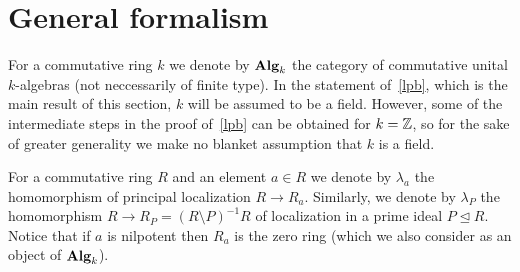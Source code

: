 \documentclass[oneside, 11pt]{amsart} \pdfoutput=1
\begin{document}
\section{General formalism}
\begin{comment}
The aim of this section is to formulate and prove Lindel--Popescu Theorem, a certain formal statement, which gives a sufficient condition for a general group-valued functor to be homotopy invariant. Later, in~\cref{sec:main} this result is applied to the functor $K_2$. Some of the machinery developed in this section also will be useful in the study of the $K_2$-analogue of Gersten's conjecture, see~\cref{sec:K2-GC}.

Let us briefly recall the historical context, which might help to explain our choice of the name for~\cref{lpb}. Recall that H.~Lindel's paper~\cite{Li81} has settled the geometric case of the Bass--Quillen conjecture for all regular $k$-algebras $R$ essentially of finite type over $k$. Later T.~Vorst has used Lindel's result in the proof of the homotopy invariance for the unstable $\K_1$-functor, see~\cite{Vo81}. Recall that Vorst's result asserts that $\K_{1,r}(R[t]) \cong \K_{1,r}(R)$ for $r\geq 3$ and a regular ring $R$ essentially finite type over a field. Next, D.~Popescu proved Bass--Quillen conjecture in equicharacteristic case~\cite{Po90}.  Finally, in her recent work~\cite{Sta14} A.~Stavrova has combined Vorst's theorem with a theorem of Popescu and obtained a more general homotopy invariance $\K_1^G(A[t]) \cong \K_1^G(A)$ for an arbitrary regular algebra $A$ over a perfect field $F$ and a sufficiently isotropic reductive group $G$ defined over $F$, see~\cite[Theorem~1.3]{Sta14}.

\subsection{A general Lindel--Popescu-type theorem}
\end{comment}
For a commutative ring $k$ we denote by ${\normalfont\textbf{Alg}}_k$ the category of commutative unital $k$-algebras (not neccessarily of finite type). In the statement of~\cref{lpb}, which is the main result of this section, $k$ will be assumed to be a field. However, some of the intermediate steps in the proof of~\cref{lpb} can be obtained for $k=\mathbb{Z}$, so for the sake of greater generality we make no blanket assumption that $k$ is a field.  

For a commutative ring $R$ and an element $a\in R$ we denote by $\lambda_a$ the homomorphism of principal localization $R \to R_a$. Similarly, we denote by $\lambda_P$ the homomorphism $R \to R_P = (R\setminus P)^{-1}R$ of localization in a prime ideal $P \trianglelefteq R$. Notice that if $a$ is nilpotent then $R_a$ is the zero ring (which we also consider as an object of ${\normalfont\textbf{Alg}}_k$). 
\end{document}
